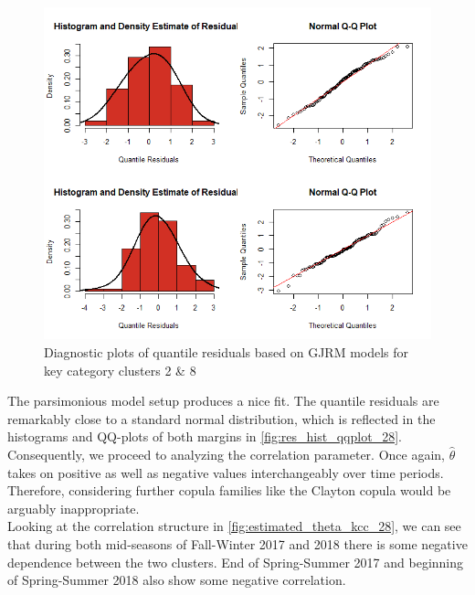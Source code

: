 \begin{figure}[H]
\centering
  \includegraphics[width=0.80\linewidth]{figures/res_hist_qqplot_28.png}
  \caption{Diagnostic plots of quantile residuals based on \ac{GJRM} models for key category clusters 2 \& 8}
  \label{fig:res_hist_qqplot_28}
\end{figure}

The parsimonious model setup produces a nice fit. The quantile residuals are remarkably close to a standard normal distribution, which is reflected in the histograms and QQ-plots of both margins in \autoref{fig:res_hist_qqplot_28}.\\
Consequently, we proceed to analyzing the correlation parameter. Once again, $\hat{\theta}$ takes on positive as well as negative values interchangeably over time periods. Therefore, considering further copula families like the Clayton copula would be arguably inappropriate.
\\


Looking at the correlation structure in \autoref{fig:estimated_theta_kcc_28}, we can see that during both mid-seasons of Fall-Winter 2017 and 2018 there is some negative dependence between the two clusters. End of Spring-Summer 2017 and beginning of Spring-Summer 2018 also show some negative correlation.
\\

